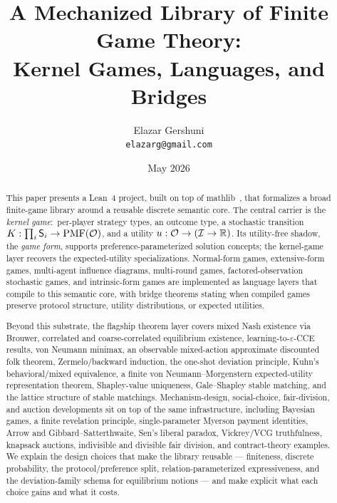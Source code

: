 \documentclass[11pt]{article}
\title{A Mechanized Library of Finite Game Theory:\\
       Kernel Games, Languages, and Bridges}
\author{Elazar Gershuni\\\texttt{elazarg@gmail.com}}
\date{May 2026}
\begin{document}
\maketitle

\begin{abstract}
This paper presents a Lean~4 project, built on top of
mathlib~\citep{mathlib2020}, that formalizes a broad finite-game
library around a reusable discrete semantic core.  The central
carrier is the \emph{kernel game}:\ per-player strategy types, an
outcome type, a stochastic transition
$K : \prod_i \mathsf{S}_i \to \mathrm{PMF}(\mathcal{O})$, and a utility
$u : \mathcal{O} \to (\mathcal{I} \to \mathbb{R})$.  Its utility-free shadow,
the \emph{game form}, supports preference-parameterized solution
concepts; the kernel-game layer recovers the expected-utility
specializations.  Normal-form games, extensive-form games,
multi-agent influence diagrams, multi-round games,
factored-observation stochastic games, and intrinsic-form games are
implemented as language layers that compile to this semantic core,
with bridge theorems stating when compiled games preserve protocol
structure, utility distributions, or expected utilities.

Beyond this substrate, the flagship theorem layer covers mixed Nash
existence via Brouwer,
correlated and coarse-correlated equilibrium existence,
learning-to-$\varepsilon$-CCE results, von Neumann minimax,
an observable mixed-action approximate discounted folk theorem,
Zermelo/backward induction, the one-shot deviation principle, Kuhn's
behavioral/mixed equivalence, a finite von Neumann--Morgenstern
expected-utility representation theorem, Shapley-value uniqueness,
Gale--Shapley stable matching, and the lattice structure of stable
matchings.  Mechanism-design, social-choice, fair-division, and
auction developments sit on top of the same infrastructure, including
Bayesian games, a finite revelation principle, single-parameter
Myerson payment identities, Arrow and Gibbard--Satterthwaite, Sen's
liberal paradox, Vickrey/VCG truthfulness, knapsack auctions,
indivisible and divisible fair division, and contract-theory examples.
We explain the design
choices that make the library reusable — finiteness, discrete
probability, the protocol/preference split, relation-parameterized
expressiveness, and the deviation-family schema for equilibrium
notions — and make explicit what each choice gains and what it
costs.
\end{abstract}

\tableofcontents

















\end{document}
